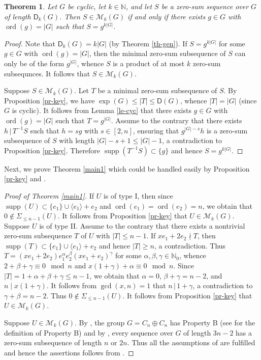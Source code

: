 \documentclass[11pt]{amsart}
\newtheorem{theorem}{Theorem}[section]
\theoremstyle{definition}
\newcommand{\N}{\mathbb N}
\DeclareMathOperator{\ord}{ord}
\DeclareMathOperator{\supp}{supp}
\renewcommand{\t}{\, | \,}
\numberwithin{equation}{section}
\begin{document}
\begin{theorem}\label{le-cyclic}
	Let $G$ be cyclic, let $k\in \N$, and let $S$ be a zero-sum sequence over $G$ of length $\mathsf D_k(G)$. Then $S\in \mathcal M_k(G)$ if and only if there exists $g\in G$ with $\ord(g)=|G|$ such that $S=g^{k|G|}$.
\end{theorem}
\begin{proof}
	Note that $\mathsf D_k(G)=k|G|$ (by Theorem \ref{th-gen}). If $S=g^{k|G|}$ for some $g\in G$ with $\ord(g)=|G|$, then the minimal zero-sum subsequence of $S$ can only be of the form $g^{|G|}$, whence $S$ is a product of at most $k$ zero-sum subsequnces. It follows that $S\in \mathcal M_k(G)$.
	
	Suppose $S\in \mathcal M_k(G)$. Let $T$ be a minimal zero-sum subsequence of $S$. By Proposition \ref{pr-key}, we have  $\exp(G)\le |T|\le \mathsf D(G)$, whence $|T|=|G|$ (since $G$ is cyclic). It follows from Lemma \ref{le-cyc} that there exists $g\in G$ with $\ord(g)=|G|$ such that $T=g^{|G|}$. Assume to the contrary that there exists $h\t T^{-1}S$ such that $h=sg$ with $s\in [2,n]$, ensuring that $g^{|G|-s}h$ is a zero-sum subsequence of $S$ with length $|G|-s+1\le |G|-1$, a contradiction to Proposition \ref{pr-key}. Therefore $\supp(T^{-1}S)\subset \{g\}$ and hence $S=g^{k|G|}$.
\end{proof}


Next, we prove Theorem \ref{main1}
 which could be handled easily by  Proposition \ref{pr-key} and \cite[Theorem 7.1]{Gao-Ger-propB}.
\begin{proof}[Proof of Theorem \ref{main1}]
	If $U$ is of type I, then since $\supp(U)\subset \{e_1\}\cup \langle e_1\rangle+e_2$ and $\ord(e_1)=\ord(e_2)=n$, we obtain that $0\not\in \Sigma_{\le n-1}(U)$. It follows from Proposition \ref{pr-key} that $U\in \mathcal M_k(G)$. Suppose $U$ is of type II. Assume to the contrary that there exists a nontrivial zero-sum subsequence $T$ of $U$ with $|T|\le n-1$. If $xe_1+2e_2\nmid T$, then $\supp(T)\subset \{e_1\}\cup \langle e_1\rangle+e_2$ and hence  $|T|\ge n$, a contradiction. Thus $T=(xe_1+2e_2)e_1^{\alpha}e_2^{\beta}(xe_1+e_2)^{\gamma}$ for some $\alpha,\beta,\gamma\in \N_0$, whence $2+\beta+\gamma\equiv 0\mod n$ and $x(1+\gamma)+\alpha\equiv 0\mod n$. Since $|T|=1+\alpha+\beta+\gamma\le n-1$, we obtain that $\alpha=0$, $\beta+\gamma=n-2$, and $n\mid x(1+\gamma)$. It follows from $\gcd(x,n)=1$ that $n\t 1+\gamma$, a contradiction to $\gamma+\beta=n-2$. Thus $0\not\in \Sigma_{\le n-1}(U)$. It follows from Proposition \ref{pr-key} that $U\in \mathcal M_k(G)$.
	
	
	Suppose $U\in \mathcal M_k(G)$. By 	\cite{Gi18}, the group $G=C_n\oplus C_n$ has Property B (see \cite[Chapter 5]{GE} for the definition of Property B) and by \cite[Theorem 6.7.2]{gaogeroldingersurvey}, every sequence over $G$ of length $3n-2$ has a zero-sum subsequence of length $n$ or $2n$. Thus all the assumptions of \cite[Theorem 7.1]{Gao-Ger-propB} are fulfilled and hence the assertions follows from \cite[Theorem 7.1]{Gao-Ger-propB}.
\end{proof} 
\end{document}

